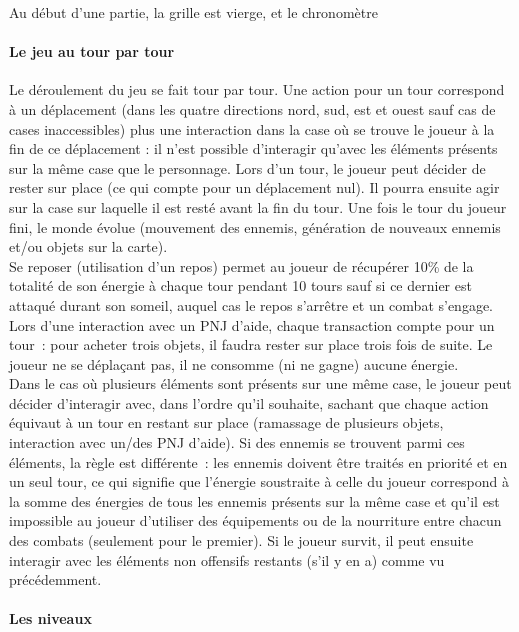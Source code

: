 \documentclass[11pt]{article}
\begin{document}
Au début d'une partie, la grille est vierge, et le chronomètre
\paragraph{Le jeu au tour par tour}

Le déroulement du jeu se fait tour par tour. Une action pour un tour correspond à un déplacement (dans les quatre directions nord, sud, est et ouest sauf cas de cases inaccessibles) plus une interaction dans la case où se trouve le joueur à la fin de ce déplacement : il n'est possible d’interagir qu'avec les éléments présents sur la même case que le personnage. Lors d'un tour, le joueur peut décider de rester sur place (ce qui compte pour un déplacement nul). Il pourra ensuite agir sur la case sur laquelle il est resté avant la fin du tour. Une fois le tour du joueur fini, le monde évolue (mouvement des ennemis, génération de nouveaux ennemis et/ou objets sur la carte).\\
Se reposer (utilisation d'un repos) permet au joueur de récupérer 10\% de la totalité de son énergie à chaque tour pendant 10 tours sauf si ce dernier est attaqué durant son someil, auquel cas le repos s'arrêtre et un combat s'engage.\\
Lors d'une interaction avec un PNJ d'aide, chaque transaction compte pour un tour~: pour acheter trois objets, il faudra rester sur place trois fois de suite. Le joueur ne se déplaçant pas, il ne consomme (ni ne gagne) aucune énergie.\\
Dans le cas où plusieurs éléments sont présents sur une même case, le joueur peut décider d’interagir avec, dans l'ordre qu'il souhaite, sachant que chaque action équivaut à un tour en restant sur place (ramassage de plusieurs objets, interaction avec un/des PNJ d'aide). Si des ennemis se trouvent parmi ces éléments, la règle est différente~: les ennemis doivent être traités en priorité et en un seul tour, ce qui signifie que l'énergie soustraite à celle du joueur correspond à la somme des énergies de tous les ennemis présents sur la même case et qu'il est impossible au joueur d'utiliser des équipements ou de la nourriture entre chacun des combats (seulement pour le premier). Si le joueur survit, il peut ensuite interagir avec les éléments non offensifs restants (s'il y en a) comme vu précédemment.

\paragraph{Les niveaux}
\end{document}
